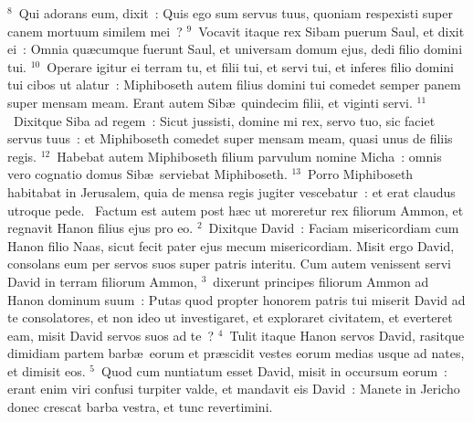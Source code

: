 ${}^{8}$~Qui adorans eum, dixit~: Quis ego sum servus tuus, quoniam respexisti super canem mortuum similem mei~?
${}^{9}$~Vocavit itaque rex Sibam puerum Saul, et dixit ei~: Omnia qu\ae cumque fuerunt Saul, et universam domum ejus, dedi filio domini tui.
${}^{10}$~Operare igitur ei terram tu, et filii tui, et servi tui, et inferes filio domini tui cibos ut alatur~: Miphiboseth autem filius domini tui comedet semper panem super mensam meam. Erant autem Sib\ae\ quindecim filii, et viginti servi.
${}^{11}$~Dixitque Siba ad regem~: Sicut jussisti, domine mi rex, servo tuo, sic faciet servus tuus~: et Miphiboseth comedet super mensam meam, quasi unus de filiis regis.
${}^{12}$~Habebat autem Miphiboseth filium parvulum nomine Micha~: omnis vero cognatio domus Sib\ae\ serviebat Miphiboseth.
${}^{13}$~Porro Miphiboseth habitabat in Jerusalem, quia de mensa regis jugiter vescebatur~: et erat claudus utroque pede.
~Factum est autem post h\ae c ut moreretur rex filiorum Ammon, et regnavit Hanon filius ejus pro eo.
${}^{2}$~Dixitque David~: Faciam misericordiam cum Hanon filio Naas, sicut fecit pater ejus mecum misericordiam. Misit ergo David, consolans eum per servos suos super patris interitu. Cum autem venissent servi David in terram filiorum Ammon,
${}^{3}$~dixerunt principes filiorum Ammon ad Hanon dominum suum~: Putas quod propter honorem patris tui miserit David ad te consolatores, et non ideo ut investigaret, et exploraret civitatem, et everteret eam, misit David servos suos ad te~?
${}^{4}$~Tulit itaque Hanon servos David, rasitque dimidiam partem barb\ae\ eorum et pr\ae scidit vestes eorum medias usque ad nates, et dimisit eos.
${}^{5}$~Quod cum nuntiatum esset David, misit in occursum eorum~: erant enim viri confusi turpiter valde, et mandavit eis David~: Manete in Jericho donec crescat barba vestra, et tunc revertimini.


